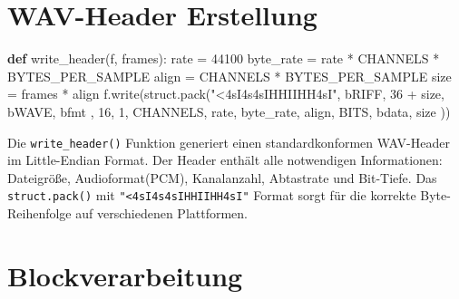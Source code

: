 \documentclass[
  ngerman,
  letterpaper,
  DIV=11]{scrreprt}
\newenvironment{Shaded}{\begin{snugshade}}{\end{snugshade}}
\newcommand{\DecValTok}[1]{\textcolor[rgb]{0.68,0.00,0.00}{#1}}
\newcommand{\KeywordTok}[1]{\textcolor[rgb]{0.00,0.23,0.31}{\textbf{#1}}}
\newcommand{\NormalTok}[1]{\textcolor[rgb]{0.00,0.23,0.31}{#1}}
\newcommand{\OperatorTok}[1]{\textcolor[rgb]{0.37,0.37,0.37}{#1}}
\newcommand{\StringTok}[1]{\textcolor[rgb]{0.13,0.47,0.30}{#1}}
\begin{document}
\section{WAV-Header Erstellung}\label{wav-header-erstellung}

\begin{Shaded}
\begin{Highlighting}[]
\KeywordTok{def}\NormalTok{ write\_header(f, frames):}
\NormalTok{    rate }\OperatorTok{=} \DecValTok{44100}
\NormalTok{    byte\_rate }\OperatorTok{=}\NormalTok{ rate }\OperatorTok{*}\NormalTok{ CHANNELS }\OperatorTok{*}\NormalTok{ BYTES\_PER\_SAMPLE}
\NormalTok{    align }\OperatorTok{=}\NormalTok{ CHANNELS }\OperatorTok{*}\NormalTok{ BYTES\_PER\_SAMPLE}
\NormalTok{    size }\OperatorTok{=}\NormalTok{ frames }\OperatorTok{*}\NormalTok{ align}
\NormalTok{    f.write(struct.pack(}\StringTok{"\textless{}4sI4s4sIHHIIHH4sI"}\NormalTok{,}
        \StringTok{b\textquotesingle{}RIFF\textquotesingle{}}\NormalTok{, }\DecValTok{36} \OperatorTok{+}\NormalTok{ size, }\StringTok{b\textquotesingle{}WAVE\textquotesingle{}}\NormalTok{,}
        \StringTok{b\textquotesingle{}fmt \textquotesingle{}}\NormalTok{, }\DecValTok{16}\NormalTok{, }\DecValTok{1}\NormalTok{, CHANNELS, rate,}
\NormalTok{        byte\_rate, align, BITS,}
        \StringTok{b\textquotesingle{}data\textquotesingle{}}\NormalTok{, size}
\NormalTok{    ))}
\end{Highlighting}
\end{Shaded}

Die \texttt{write\_header()} Funktion generiert einen standardkonformen
WAV-Header im Little-Endian Format. Der Header enthält alle notwendigen
Informationen: Dateigröße, Audioformat(PCM), Kanalanzahl, Abtastrate und
Bit-Tiefe. Das \texttt{struct.pack()} mit
\texttt{"\textless{}4sI4s4sIHHIIHH4sI"} Format sorgt für die korrekte
Byte-Reihenfolge auf verschiedenen Plattformen.

\section{Blockverarbeitung}\label{blockverarbeitung}
\end{document}
